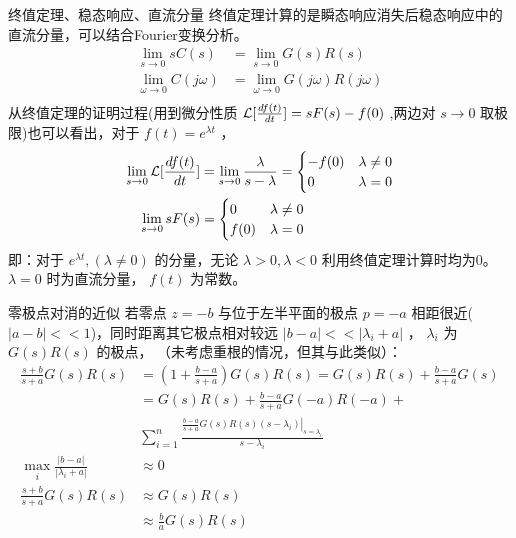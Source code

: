 \documentclass[presentation]{beamer}
\begin{document}
\begin{frame}[label={sec:org84c5ccf}]{终值定理、稳态响应、直流分量}
终值定理计算的是瞬态响应消失后稳态响应中的直流分量，可以结合Fourier变换分析。
\begin{align*}
\lim_{s\to 0}sC(s) &= \lim_{s\to 0}G(s)R(s) \\
\lim_{\omega\to 0}C(j\omega) &= \lim_{\omega\to 0}G(j\omega)R(j\omega)\\
\end{align*}
从终值定理的证明过程(用到微分性质 \({\cal L}[\frac{df(t)}{dt}]=sF(s)-f(0)\) ,两边对 \(s\to 0\) 取极限)也可以看出，对于 \(f(t)=e^{\lambda t}\) ，
\begin{align*}
\lim_{s\to 0}{\cal L} [\frac{df(t)}{dt}]&=\lim_{s\to 0}\frac{\lambda}{s-\lambda}=
\begin{cases}
-f(0)  & \lambda\neq 0\\
0   & \lambda=0
\end{cases}\\
\lim_{s\to 0} sF(s) &=
\begin{cases}
0  & \lambda\neq 0\\
f(0)   & \lambda=0
\end{cases}
\end{align*}
即：对于 \(e^{\lambda t},(\lambda\neq0)\) 的分量，无论 \(\lambda>0,\lambda<0\) 利用终值定理计算时均为0。\(\lambda=0\) 时为直流分量， \(f(t)\) 为常数。
\end{frame}
\begin{frame}[label={sec:orgf719ccc}]{零极点对消的近似}
若零点 \(z=-b\) 与位于左半平面的极点 \(p=-a\) 相距很近(\(|a-b|<<1\))，同时距离其它极点相对较远 \(|b-a|<<|\lambda_i+a|\) ， \(\lambda_i\) 为 \(G(s)R(s)\) 的极点， （未考虑重根的情况，但其与此类似）：
\begin{align*}
\frac{s+b}{s+a}G(s)R(s) & = (1+\frac{b-a}{s+a})G(s)R(s)=G(s)R(s)+\frac{b-a}{s+a}G(s)\\
&=G(s)R(s)+\frac{b-a}{s+a}G(-a)R(-a)+\\
& \sum_{i=1}^n \frac{\left.\frac{b-a}{s+a}G(s)R(s)(s-\lambda_i)\right|_{s=\lambda_i}}{s-\lambda_i}\\
\max_{i}\frac{|b-a|}{|\lambda_i+a|} &\approx 0\\
\frac{s+b}{s+a}G(s)R(s) & \approx G(s)R(s)\\
& \approx \frac{b}{a}G(s)R(s) 
\end{align*}
\end{frame}
\end{document}
